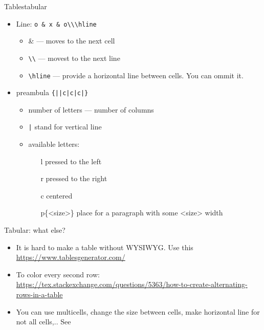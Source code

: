 \begin{frame}[fragile]{Tables}{tabular}\relax
     \begin{itemize}
         \item Line: \verb!o & x & o\\\hline!
         \begin{itemize}
             \item {\csk \&} --- moves to the next cell 
             \item {\csk \verb!\\!} --- movest to the next line 
             \item {\csk \verb!\hline!} --- provide a horizontal line between cells. You can ommit it.
         \end{itemize}
         \item preambula {\csk \verb!{||c|c|c|}!} 
         \begin{itemize}
             \item number of letters --- number of columns
             \item {\csk \verb!|!} stand for vertical line 
             \item available letters:
             \begin{itemize}
                 \item[l] pressed to the left
                 \item[r] pressed to the right
                 \item[c] centered
                 \item[p\{<size>\}] place for a paragraph with some <size> width 
             \end{itemize}
         \end{itemize}
     \end{itemize}
\end{frame}

\begin{frame}[fragile]{Tabular: what else?}
     \begin{itemize}
         \item It is hard to make a table without WYSIWYG. Use this {\csk\url{https://www.tablesgenerator.com/}}
         \item To color every second row: \url{https://tex.stackexchange.com/questions/5363/how-to-create-alternating-rows-in-a-table}
         \item You can use multicells, change the size between cells, make horizontal line for not all cells,.. See 
          
     \end{itemize}
\end{frame}